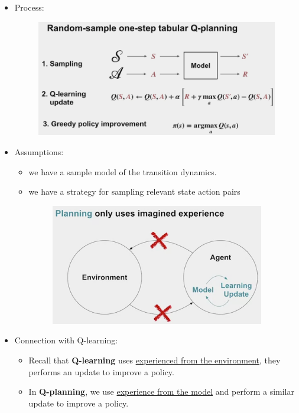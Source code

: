 \documentclass[12pt, a4paper]{article}
\begin{document}
\begin{itemize}
  \item Process:
  \begin{figure}[H]
    \centering
      \includegraphics[width=0.8\columnwidth]{images/random-sample-one-step-tabular-q-learning.png}
      \label{fig:random-sample-one-step-tabular-q-learning}
  \end{figure}
  \item Assumptions:
  \begin{itemize}
    \item we have a sample model of the transition dynamics.
    \item we have a strategy for sampling relevant state action pairs
    \begin{figure}[H]
      \centering
        \includegraphics[width=0.5\columnwidth]{images/planning3.png}
        \label{fig:planning3}
    \end{figure}
  \end{itemize}
  \item Connection with Q-learning:
  \begin{itemize}
    \item Recall that \textbf{Q-learning} uses \uline{experienced from the environment}, they performs an update to improve a policy.
    \item In \textbf{Q-planning}, we use \uline{experience from the model} and perform a similar update to improve a policy.
  \end{itemize}
\end{itemize}
\end{document}
